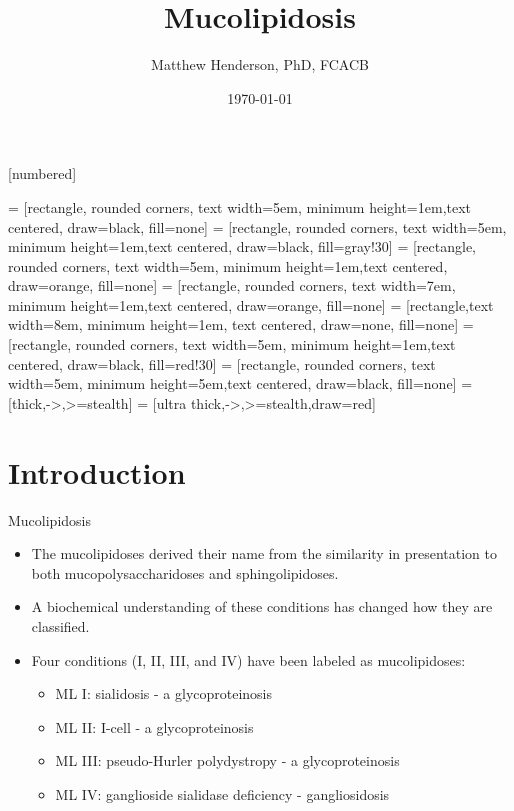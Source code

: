 \documentclass[presentation, smaller]{beamer}
\author{Matthew Henderson, PhD, FCACB}
\date{\today}
\title{Mucolipidosis}
\institute[NSO]{Newborn Screening Ontario | The University of Ottawa}
\begin{document}
\maketitle

\vspace{220pt}
\beamertemplatenavigationsymbolsempty
{}[numbered]

 = [rectangle, rounded corners, text width=5em, minimum height=1em,text centered, draw=black, fill=none]
 = [rectangle, rounded corners, text width=5em, minimum height=1em,text centered, draw=black, fill=gray!30]
 = [rectangle, rounded corners, text width=5em, minimum height=1em,text centered, draw=orange, fill=none]
 = [rectangle, rounded corners, text width=7em, minimum height=1em,text centered, draw=orange, fill=none]
 = [rectangle,text width=8em, minimum height=1em, text centered, draw=none, fill=none]
 = [rectangle, rounded corners, text width=5em, minimum height=1em,text centered, draw=black, fill=red!30]
 = [rectangle, rounded corners, text width=5em, minimum height=5em,text centered, draw=black, fill=none]
 = [thick,->,>=stealth]
 = [ultra thick,->,>=stealth,draw=red]


\section{Introduction}
\label{sec:orgheadline3}
\begin{frame}[label={sec:orgheadline1}]{Mucolipidosis}
\begin{itemize}
\item The mucolipidoses derived their name from the similarity in
presentation to both mucopolysaccharidoses and sphingolipidoses.

\item A biochemical understanding of these conditions has changed how they
are classified.
\item Four conditions (I, II, III, and IV) have been labeled as
mucolipidoses:
\begin{itemize}
\item ML I: sialidosis - a glycoproteinosis
\item ML II: I-cell - a glycoproteinosis
\item ML III: pseudo-Hurler polydystropy - a glycoproteinosis
\item ML IV: ganglioside sialidase deficiency - gangliosidosis
\end{itemize}
\end{itemize}
\end{frame}
\end{document}
